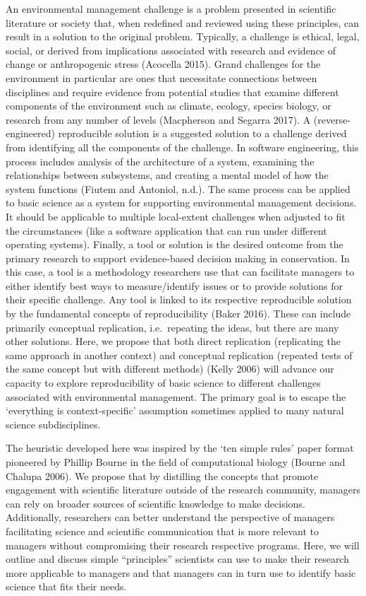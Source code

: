 \documentclass[fleqn,10pt]{wlpeerj} %
\begin{document}
An environmental management challenge is a problem presented in
scientific literature or society that, when redefined and reviewed using
these principles, can result in a solution to the original problem.
Typically, a challenge is ethical, legal, social, or derived from
implications associated with research and evidence of change or
anthropogenic stress (Acocella 2015). Grand challenges for the
environment in particular are ones that necessitate connections between
disciplines and require evidence from potential studies that examine
different components of the environment such as climate, ecology,
species biology, or research from any number of levels (Macpherson and
Segarra 2017). A (reverse-engineered) reproducible solution is a
suggested solution to a challenge derived from identifying all the
components of the challenge. In software engineering, this process
includes analysis of the architecture of a system, examining the
relationships between subsystems, and creating a mental model of how the
system functions (Fiutem and Antoniol, n.d.). The same process can be
applied to basic science as a system for supporting environmental
management decisions. It should be applicable to multiple local-extent
challenges when adjusted to fit the circumstances (like a software
application that can run under different operating systems). Finally, a
tool or solution is the desired outcome from the primary research to
support evidence-based decision making in conservation. In this case, a
tool is a methodology researchers use that can facilitate managers to
either identify best ways to measure/identify issues or to provide
solutions for their specific challenge. Any tool is linked to its
respective reproducible solution by the fundamental concepts of
reproducibility (Baker 2016). These can include primarily conceptual
replication, i.e.~repeating the ideas, but there are many other
solutions. Here, we propose that both direct replication (replicating
the same approach in another context) and conceptual replication
(repeated tests of the same concept but with different methods) (Kelly
2006) will advance our capacity to explore reproducibility of basic
science to different challenges associated with environmental
management. The primary goal is to escape the `everything is
context-specific' assumption sometimes applied to many natural science
subdisciplines.

The heuristic developed here was inspired by the `ten simple rules'
paper format pioneered by Phillip Bourne in the field of computational
biology (Bourne and Chalupa 2006). We propose that by distilling the
concepts that promote engagement with scientific literature outside of
the research community, managers can rely on broader sources of
scientific knowledge to make decisions. Additionally, researchers can
better understand the perspective of managers facilitating science and
scientific communication that is more relevant to managers without
compromising their research respective programs. Here, we will outline
and discuss simple ``principles'' scientists can use to make their
research more applicable to managers and that managers can in turn use
to identify basic science that fits their needs.
\end{document}
